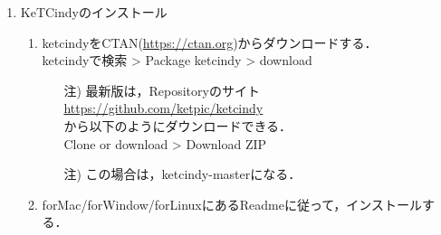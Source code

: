 \documentclass{ujarticle}
\begin{document}
\begin{enumerate}[\bf\large 1.]
\item KeTCindyのインストール
  \begin{enumerate}[(1)]
  \item ketcindyをCTAN(\url{https://ctan.org})からダウンロードする．\\
  \hspace*{10mm}ketcindyで検索 > Pack­age ketcindy > download
    \begin{itemize}
    \item[注)]最新版は，Repositoryのサイト\\
        \hspace*{10mm}\url{https://github.com/ket­pic/ketcindy}\\
       から以下のようにダウンロードできる．\\
        \hspace*{10mm}Clone or download > Download ZIP
    \item[注)]この場合は，ketcindy-masterになる．
    \end{itemize}
  \item forMac/forWindow/forLinuxにあるReadmeに従って，インストールする．
  \end{enumerate}
\end{enumerate}
\end{document}
